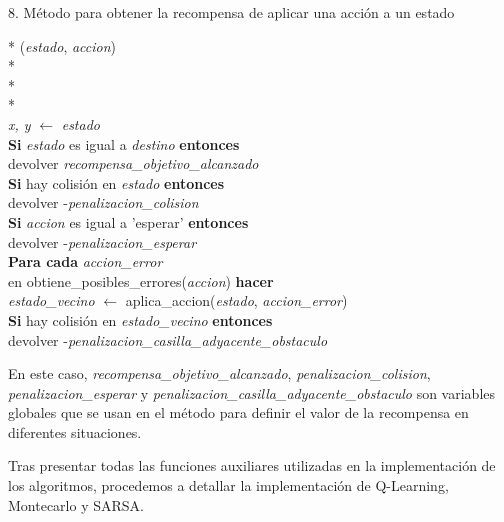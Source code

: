 \documentclass[conference,a4paper]{IEEEtran}
\begin{document}
8. Método para obtener la recompensa de aplicar una acción a un estado
  \begin{pseudo}*
    (\textit{estado}, \textit{accion}) \\*
     \\*
     \\*
     \\
    \textit{x, y} $\leftarrow$ \textit{estado} \\
    \textbf{Si} \textit{estado} es igual a \textit{destino} \textbf{entonces} \\
    \> devolver \textit{recompensa\_objetivo\_alcanzado} \\
    \textbf{Si} hay colisión en \textit{estado} \textbf{entonces} \\
    \> devolver -\textit{penalizacion\_colision} \\
    \textbf{Si} \textit{accion} es igual a 'esperar' \textbf{entonces} \\
    \> devolver -\textit{penalizacion\_esperar} \\
    \textbf{Para cada} \textit{accion\_error} \\ en obtiene\_posibles\_errores(\textit{accion}) \textbf{hacer} \\
    \> \textit{estado\_vecino} $\leftarrow$ aplica\_accion(\textit{estado}, \textit{accion\_error}) \\
    \> \textbf{Si} hay colisión en \textit{estado\_vecino} \textbf{entonces} \\
    \> \> devolver -\textit{penalizacion\_casilla\_adyacente\_obstaculo} \\
  \end{pseudo}

  \vspace{0.5cm} 
  En este caso, \textit{recompensa\_objetivo\_alcanzado}, \textit{penalizacion\_colision}, \textit{penalizacion\_esperar} y \textit{penalizacion\_casilla\_adyacente\_obstaculo}
son variables globales que se usan en el método para definir el valor de la recompensa en diferentes situaciones.\newline

Tras presentar todas las funciones auxiliares utilizadas en la implementación de los algoritmos, procedemos a detallar la implementación de Q-Learning, Montecarlo y SARSA.\newline 
\end{document}
